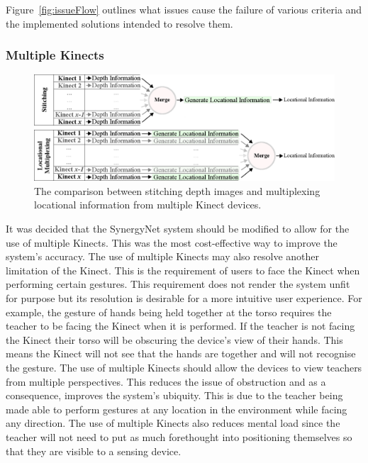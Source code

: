 \documentclass[link]{IWCOMP}
\begin{document}
Figure~\ref{fig:issueFlow} outlines what issues cause the failure of various criteria and the implemented solutions intended to resolve them.

\subsubsection{Multiple Kinects} 
\label{subsubsec:studyImplementationMultipleKinects}

\begin{figure}[t]
  \centering
  \includegraphics[width=1\textwidth]{figures/multiplexing_flow_diagram.png}
  \caption{The comparison between stitching depth images and multiplexing locational information from multiple Kinect devices.}
  \label{fig:multiplexing}
\end{figure}

It was decided that the SynergyNet system should be modified to allow for the use of multiple Kinects.
This was the most cost-effective way to improve the system's accuracy.
The use of multiple Kinects may also resolve another limitation of the Kinect.
This is the requirement of users to face the Kinect when performing certain gestures.
This requirement does not render the system unfit for purpose but its resolution is desirable for a more intuitive user experience.
For example, the gesture of hands being held together at the torso requires the teacher to be facing the Kinect when it is performed.
If the teacher is not facing the Kinect their torso will be obscuring the device's view of their hands.
This means the Kinect will not see that the hands are together and will not recognise the gesture.
The use of multiple Kinects should allow the devices to view teachers from multiple perspectives.
This reduces the issue of obstruction and as a consequence, improves the system's ubiquity.
This is due to the teacher being made able to perform gestures at any location in the environment while facing any direction.
The use of multiple Kinects also reduces mental load since the teacher will not need to put as much forethought into positioning themselves so that they are visible to a sensing device.
\end{document}
